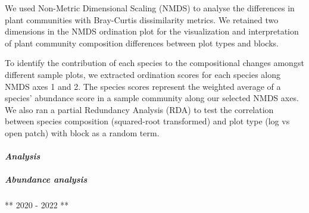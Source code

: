 \documentclass[
]{article}
\begin{document}
We used Non-Metric Dimensional Scaling (NMDS) to analyse the differences
in plant communities with Bray-Curtis dissimilarity metrics. We retained
two dimensions in the NMDS ordination plot for the visualization and
interpretation of plant community composition differences between plot
types and blocks.

To identify the contribution of each species to the compositional
changes amongst different sample plots, we extracted ordination scores
for each species along NMDS axes 1 and 2. The species scores represent
the weighted average of a species' abundance score in a sample community
along our selected NMDS axes. We also ran a partial Redundancy Analysis
(RDA) to test the correlation between species composition (squared-root
transformed) and plot type (log vs open patch) with block as a random
term.

\hypertarget{analysis}{%
\paragraph{\texorpdfstring{\emph{Analysis}}{Analysis }}\label{analysis}}

\hypertarget{abundance-analysis}{%
\subparagraph{Abundance analysis}\label{abundance-analysis}}

** 2020 - 2022 **
\end{document}
